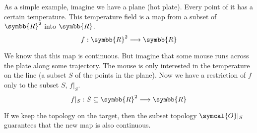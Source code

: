    As a simple example, imagine we have a plane (hot plate). Every point of it has a certain
   temperature.   This temperature field is a map from a subset of $\symbb{R}^2$ into $\symbb{R}$.
   \[
     f : \symbb{R}^2 \longrightarrow \symbb{R}
   \]

   We know that this map is continuous. But imagine that some mouse runs across the plate along
   some trajectory. The mouse is only interested in the temperature on the line (a subset $S$ of
   the points in the plane). Now we have a restriction of $f$ only to the subset $S$, $f|_S$.
   \[
     f|_S : S\subseteq\symbb{R}^2 \longrightarrow \symbb{R}
   \]

   If we keep the topology on the target, then the subset topology $\symcal{O}|_S$ guarantees
   that the new map is also continuous.
   
 
 

  

  

  










